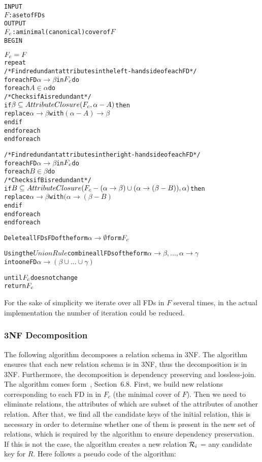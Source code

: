 \begin{alltt}
INPUT 
  \(F\)  : a set of FDs
OUTPUT 
  \(F\sb{c}\) : a minimal (canonical) cover of \(F\)
BEGIN

\(F\sb{c} = F\)
repeat
  /* Find redundant attributes in the left-hand side of each FD */
  foreach FD \(\alpha \rightarrow \beta\) in \(F\sb{c}\) do
    foreach \(A \in \alpha\) do
      /* Checks if A is redundant */
      if \(\beta \subseteq AttributeClosure(F\sb{c}, \alpha-A)\) then
        replace \(\alpha \rightarrow \beta\) with \((\alpha-A) \rightarrow \beta\)
      end if
    end foreach
  end foreach
    
  /* Find redundant attributes in the right-hand side of each FD */
  foreach FD \(\alpha \rightarrow \beta\) in \(F\sb{c}\) do
    foreach \(B \in \beta\) do
      /* Checks if B is redundant */
      if \(B \subseteq AttributeClosure(F\sb{c}-(\alpha \rightarrow \beta) \cup (\alpha \rightarrow (\beta - B)), \alpha)\) then
        replace \(\alpha \rightarrow \beta\) with \((\alpha \rightarrow (\beta-B)\)
      end if
    end foreach
  end foreach
    
  Delete all FDs FD of the form \(\alpha \rightarrow \emptyset\) form \(F\sb{c}\)
    
  Using the \(Union Rule\) combine all FDs of the form \(\alpha \rightarrow \beta,...,\alpha \rightarrow \gamma\)
    into one FD \(\alpha \rightarrow (\beta \cup ... \cup \gamma)\)
    
until \(F\sb{c}\) does not change
return \(F\sb{c}\)
\end{alltt}

For the sake of simplicity we iterate over all FDs in $F$ several times, in the actual implementation
the number of iteration could be reduced. 

\subsubsection{3NF Decomposition}
The following algorithm decomposes a relation schema in 3NF. The algorithm
ensures that each new relation schema is in 3NF, thus the decomposition is in 3NF. 
Furthermore, the decomposition is dependency preserving and lossless-join. 
The algorithm comes form~\cite{bdb2}, Section~6.8. 
First, we build new relations corresponding to each FD in in $F_{c}$ (the minimal cover of $F$). 
Then we need to eliminate relations, the attributes of
which are subset of the attributes of another relation. 
After that, we find all the candidate keys of
the initial relation, this is necessary in order to determine  whether one of them is present
in the new set of relations, which is required by the algorithm to ensure
dependency preservation. If this is not the case, the algorithm creates
a new relation \(\mathcal{R}\sb{i}\) = any candidate key for \(R\).
Here follows a pseudo code of the algorithm:

